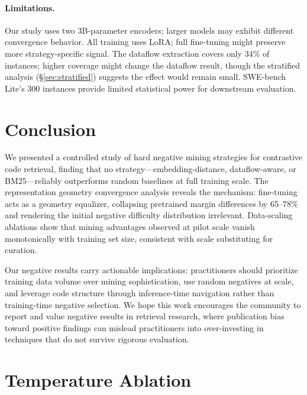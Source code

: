 \documentclass[11pt,a4paper]{article}
\begin{document}
\paragraph{Limitations.}
Our study uses two 3B-parameter encoders; larger models may exhibit different convergence behavior.
All training uses LoRA; full fine-tuning might preserve more strategy-specific signal.
The dataflow extraction covers only 34\% of instances; higher coverage might change the dataflow result, though the stratified analysis (\S\ref{sec:stratified}) suggests the effect would remain small.
SWE-bench Lite's 300 instances provide limited statistical power for downstream evaluation.

\section{Conclusion}
\label{sec:conclusion}

We presented a controlled study of hard negative mining strategies for contrastive code retrieval, finding that no strategy---embedding-distance, dataflow-aware, or BM25---reliably outperforms random baselines at full training scale.
The representation geometry convergence analysis reveals the mechanism: fine-tuning acts as a geometry equalizer, collapsing pretrained margin differences by 65--78\% and rendering the initial negative difficulty distribution irrelevant.
Data-scaling ablations show that mining advantages observed at pilot scale vanish monotonically with training set size, consistent with scale substituting for curation.

Our negative results carry actionable implications: practitioners should prioritize training data volume over mining sophistication, use random negatives at scale, and leverage code structure through inference-time navigation rather than training-time negative selection.
We hope this work encourages the community to report and value negative results in retrieval research, where publication bias toward positive findings can mislead practitioners into over-investing in techniques that do not survive rigorous evaluation.

\appendix
\section{Temperature Ablation}
\label{app:temperature}
\end{document}
